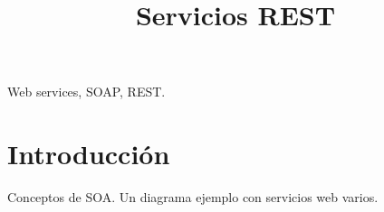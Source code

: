 \documentclass[conference]{IEEEtran}
\begin{document}
%
\title{Servicios REST}


\author{
}



\maketitle


\begin{abstract}
  \lipsum[1]
\end{abstract}

\begin{IEEEkeywords}
Web services, SOAP, REST.
\end{IEEEkeywords}



%
\IEEEpeerreviewmaketitle

\section{Introducción}

Conceptos de SOA. Un diagrama ejemplo con servicios web varios.
\end{document}

